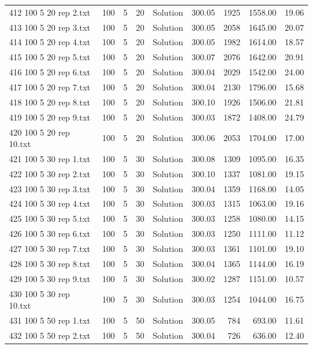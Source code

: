 \begin{longtable}{lrrllrrrr}
412 100 5 20 rep 2.txt & 100 & 5 & 20 & Solution & 300.05 & 1925 & 1558.00 & 19.06\\
413 100 5 20 rep 3.txt & 100 & 5 & 20 & Solution & 300.05 & 2058 & 1645.00 & 20.07\\
414 100 5 20 rep 4.txt & 100 & 5 & 20 & Solution & 300.05 & 1982 & 1614.00 & 18.57\\
415 100 5 20 rep 5.txt & 100 & 5 & 20 & Solution & 300.07 & 2076 & 1642.00 & 20.91\\
416 100 5 20 rep 6.txt & 100 & 5 & 20 & Solution & 300.04 & 2029 & 1542.00 & 24.00\\
417 100 5 20 rep 7.txt & 100 & 5 & 20 & Solution & 300.04 & 2130 & 1796.00 & 15.68\\
418 100 5 20 rep 8.txt & 100 & 5 & 20 & Solution & 300.10 & 1926 & 1506.00 & 21.81\\
419 100 5 20 rep 9.txt & 100 & 5 & 20 & Solution & 300.03 & 1872 & 1408.00 & 24.79\\
420 100 5 20 rep 10.txt & 100 & 5 & 20 & Solution & 300.06 & 2053 & 1704.00 & 17.00\\
421 100 5 30 rep 1.txt & 100 & 5 & 30 & Solution & 300.08 & 1309 & 1095.00 & 16.35\\
422 100 5 30 rep 2.txt & 100 & 5 & 30 & Solution & 300.10 & 1337 & 1081.00 & 19.15\\
423 100 5 30 rep 3.txt & 100 & 5 & 30 & Solution & 300.04 & 1359 & 1168.00 & 14.05\\
424 100 5 30 rep 4.txt & 100 & 5 & 30 & Solution & 300.03 & 1315 & 1063.00 & 19.16\\
425 100 5 30 rep 5.txt & 100 & 5 & 30 & Solution & 300.03 & 1258 & 1080.00 & 14.15\\
426 100 5 30 rep 6.txt & 100 & 5 & 30 & Solution & 300.03 & 1250 & 1111.00 & 11.12\\
427 100 5 30 rep 7.txt & 100 & 5 & 30 & Solution & 300.03 & 1361 & 1101.00 & 19.10\\
428 100 5 30 rep 8.txt & 100 & 5 & 30 & Solution & 300.04 & 1365 & 1144.00 & 16.19\\
429 100 5 30 rep 9.txt & 100 & 5 & 30 & Solution & 300.02 & 1287 & 1151.00 & 10.57\\
430 100 5 30 rep 10.txt & 100 & 5 & 30 & Solution & 300.03 & 1254 & 1044.00 & 16.75\\
431 100 5 50 rep 1.txt & 100 & 5 & 50 & Solution & 300.05 & 784 & 693.00 & 11.61\\
432 100 5 50 rep 2.txt & 100 & 5 & 50 & Solution & 300.04 & 726 & 636.00 & 12.40\\

\end{longtable}
